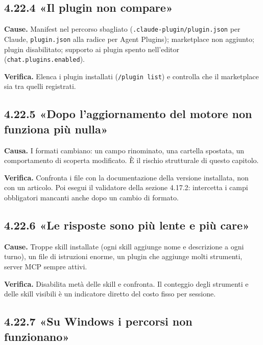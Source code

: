 \documentclass[
  italian,
  10pt,
]{book}
\begin{document}
\subsection{4.22.4 «Il plugin non compare»}\label{il-plugin-non-compare}

\textbf{Cause.} Manifest nel percorso sbagliato
(\texttt{.claude-plugin/plugin.json} per Claude, \texttt{plugin.json}
alla radice per Agent Plugins); marketplace non aggiunto; plugin
disabilitato; supporto ai plugin spento nell'editor
(\texttt{chat.plugins.enabled}).

\textbf{Verifica.} Elenca i plugin installati (\texttt{/plugin\ list}) e
controlla che il marketplace sia tra quelli registrati.

\subsection{4.22.5 «Dopo l'aggiornamento del motore non funziona più
nulla»}\label{dopo-laggiornamento-del-motore-non-funziona-piuxf9-nulla}

\textbf{Causa.} I formati cambiano: un campo rinominato, una cartella
spostata, un comportamento di scoperta modificato. È il rischio
strutturale di questo capitolo.

\textbf{Verifica.} Confronta i file con la documentazione della versione
installata, non con un articolo. Poi esegui il validatore della sezione
4.17.2: intercetta i campi obbligatori mancanti anche dopo un cambio di
formato.

\subsection{4.22.6 «Le risposte sono più lente e più
care»}\label{le-risposte-sono-piuxf9-lente-e-piuxf9-care}

\textbf{Cause.} Troppe skill installate (ogni skill aggiunge nome e
descrizione a ogni turno), un file di istruzioni enorme, un plugin che
aggiunge molti strumenti, server MCP sempre attivi.

\textbf{Verifica.} Disabilita metà delle skill e confronta. Il conteggio
degli strumenti e delle skill visibili è un indicatore diretto del costo
fisso per sessione.

\subsection{4.22.7 «Su Windows i percorsi non
funzionano»}\label{su-windows-i-percorsi-non-funzionano}
\end{document}
